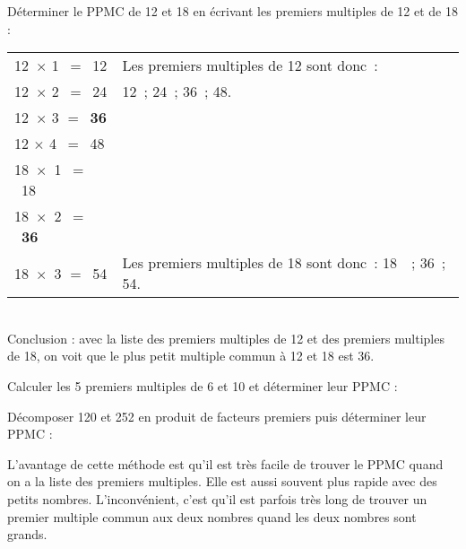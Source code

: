 \begin{methode*1}
 

\begin{exemple*1}
Déterminer le PPMC de 12 et 18 en écrivant les premiers multiples de 12 et de 18 : \\[1em]
 \begin{tabularx}{\textwidth}{l|X}
 \textcolor{A1}{12 $\times$ 1 $=$ 12} & Les premiers multiples de 12 sont donc :  \\ 
 \textcolor{A1}{12 $\times$ 2 $=$ 24} &  12 ; 24 ; 36 ; 48.\\
 \textcolor{A1}{12 $\times$ 3 $=$ \textbf{36}} &  \\
 \textcolor{A1}{12 $\times$ 4 $=$ 48} &  \\ 
 \textcolor{A1}{18 $\times$ 1 $=$ 18} &  \\
 \textcolor{A1}{18 $\times$ 2 $=$ \textbf{36}} &  \\
 \textcolor{A1}{18 $\times$ 3 $=$ 54} & Les premiers multiples de 18 sont donc : 18  ; 36 ; 54. \\
\end{tabularx} \\[1em]
Conclusion : avec la liste des premiers multiples de 12 et des premiers multiples de 18, on voit que le plus petit multiple commun à 12 et 18 est 36. \\[-2em]
 \end{exemple*1}
 
 \exercice
Calculer les 5 premiers multiples de 6 et 10 et déterminer leur PPMC :
 


 \exercice
Décomposer 120 et 252 en produit de facteurs premiers puis déterminer leur PPMC :
 


 \end{methode*1}
 
 
 
 
\begin{remarque}
L'avantage de cette méthode est qu'il est très facile de trouver le PPMC quand on a la liste des premiers multiples. Elle est aussi souvent plus rapide avec des petits nombres. L'inconvénient, c'est qu'il est parfois très long de trouver un premier multiple commun aux deux nombres quand les deux nombres sont grands.
 \end{remarque}
 
 
 
 
 \newpage
  
